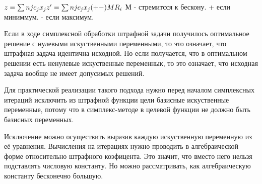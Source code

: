 $z = \sum{n}{j} c_j x_j \\
z' = \sum{n}{j} c_j x_j (+-) MR_i \\
$
М - стремитсся к бескону.
+ если миниммум.
- если максимум.

Если в ходе симплексной обработки штрафной задачи получилось оптимальное решение с нулевыми искуственными переменными,
то это означает, что штрафная задача идентична исходной.
Но если получается, что в оптимальном решении есть ненулевые искуственные переменнык,
то это означает, что исходная задача вообще не имеет допусимых решений.

Для практической реализации такого подхода нужно перед началом симплексных итераций исключить из
штрафной функции цели базисные искуственные переменные,
потому что в симплекс-методе в целевой функции не должно быть базисных переменных.

Исключение можно осуществить выразив каждую искуственную переменную из её уравнения.
Вычисления на итерациях нужно проводить в алгебраической форме относительно штрафного коэфицента. Это значит, что вместо него нельзя подставлять числовую константу.
Но можно рассматривать, как алгебраическую константу бесконечно большую.


